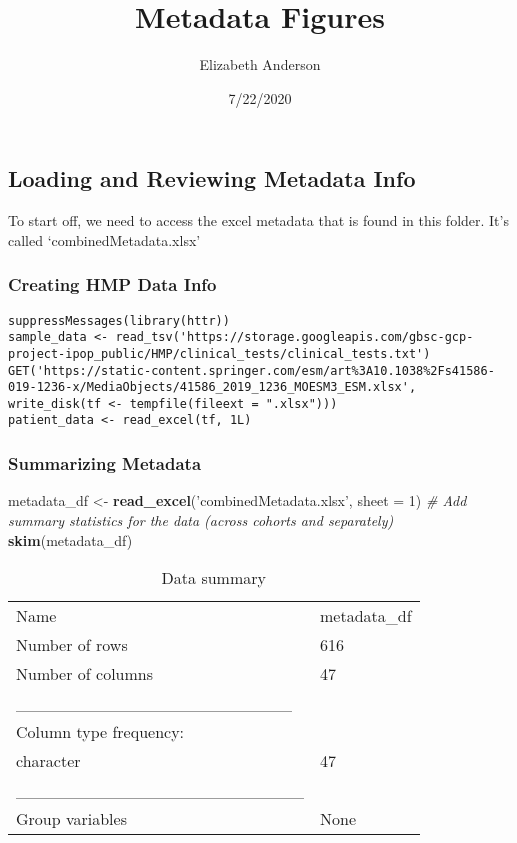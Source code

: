 \documentclass[]{article}
\title{Metadata Figures}
\author{Elizabeth Anderson}
\date{7/22/2020}
\newenvironment{Shaded}{\begin{snugshade}}{\end{snugshade}}
\newcommand{\CommentTok}[1]{\textcolor[rgb]{0.56,0.35,0.01}{\textit{#1}}}
\newcommand{\DataTypeTok}[1]{\textcolor[rgb]{0.13,0.29,0.53}{#1}}
\newcommand{\DecValTok}[1]{\textcolor[rgb]{0.00,0.00,0.81}{#1}}
\newcommand{\KeywordTok}[1]{\textcolor[rgb]{0.13,0.29,0.53}{\textbf{#1}}}
\newcommand{\NormalTok}[1]{#1}
\newcommand{\StringTok}[1]{\textcolor[rgb]{0.31,0.60,0.02}{#1}}
\begin{document}
\maketitle

\hypertarget{loading-and-reviewing-metadata-info}{%
\subsection{Loading and Reviewing Metadata
Info}\label{loading-and-reviewing-metadata-info}}

To start off, we need to access the excel metadata that is found in this
folder. It's called `combinedMetadata.xlsx'

\hypertarget{creating-hmp-data-info}{%
\subsubsection{Creating HMP Data Info}\label{creating-hmp-data-info}}

\begin{verbatim}
suppressMessages(library(httr))
sample_data <- read_tsv('https://storage.googleapis.com/gbsc-gcp-project-ipop_public/HMP/clinical_tests/clinical_tests.txt')
GET('https://static-content.springer.com/esm/art%3A10.1038%2Fs41586-019-1236-x/MediaObjects/41586_2019_1236_MOESM3_ESM.xlsx', write_disk(tf <- tempfile(fileext = ".xlsx")))
patient_data <- read_excel(tf, 1L)
\end{verbatim}

\hypertarget{summarizing-metadata}{%
\subsubsection{Summarizing Metadata}\label{summarizing-metadata}}

\begin{Shaded}
\begin{Highlighting}[]
\NormalTok{metadata_df <-}\StringTok{ }\KeywordTok{read_excel}\NormalTok{(}\StringTok{'combinedMetadata.xlsx'}\NormalTok{, }\DataTypeTok{sheet =} \DecValTok{1}\NormalTok{)}
\CommentTok{# Add summary statistics for the data (across cohorts and separately)}
\KeywordTok{skim}\NormalTok{(metadata_df)}
\end{Highlighting}
\end{Shaded}

\begin{longtable}[]{@{}ll@{}}
\caption{Data summary}\tabularnewline
\toprule
\endhead
Name & metadata\_df\tabularnewline
Number of rows & 616\tabularnewline
Number of columns & 47\tabularnewline
\_\_\_\_\_\_\_\_\_\_\_\_\_\_\_\_\_\_\_\_\_\_\_ &\tabularnewline
Column type frequency: &\tabularnewline
character & 47\tabularnewline
\_\_\_\_\_\_\_\_\_\_\_\_\_\_\_\_\_\_\_\_\_\_\_\_ &\tabularnewline
Group variables & None\tabularnewline
\bottomrule
\end{longtable}
\end{document}
